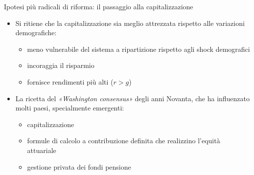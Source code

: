 \documentclass[11pt]{beamer}
\begin{document}
\begin{frame}{Ipotesi più radicali di riforma: il passaggio alla capitalizzazione}
\begin{itemize}
\item Si ritiene che la capitalizzazione sia meglio attrezzata rispetto alle
variazioni demografiche:
\begin{itemize}
\item meno vulnerabile del sistema a ripartizione rispetto agli shock
demografici
\item incoraggia il risparmio
\item fornisce rendimenti più alti ($r>g$)
\end{itemize}
\item La ricetta del \emph{«Washington consensus»} degli anni Novanta, che ha
influenzato molti paesi, specialmente emergenti:
\begin{itemize}
\item capitalizzazione
\item formule di calcolo a contribuzione definita che realizzino l'equità
attuariale
\item gestione privata dei fondi pensione
\end{itemize}
\end{itemize}
\end{frame}
\end{document}
